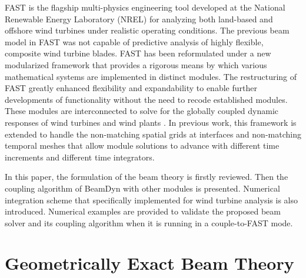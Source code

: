 \documentclass{aiaa-tc}
\begin{document}
FAST is the flagship multi-physics engineering tool developed at the National Renewable Energy Laboratory
(NREL) for analyzing both land-based and
offshore wind turbines under realistic operating conditions.  The previous
beam model in FAST was not capable of predictive analysis of highly flexible,
composite wind turbine blades. FAST has been reformulated under a
new modularized framework that provides a rigorous means by which various
mathematical systems are implemented in distinct modules. The restructuring of FAST greatly enhanced flexibility and expandability to enable further developments of functionality without the need to recode established modules. These modules are interconnected to solve for the globally coupled dynamic responses of wind turbines and wind plants \cite{Jonkman:2013,website:FASTModularizationFramework}. In previous work, this framework is extended to handle the non-matching spatial grids at interfaces and non-matching temporal meshes that allow module solutions to advance with different time increments and different time integrators. \cite{Sprague:2014}

In this paper, the formulation of the beam theory is firstly reviewed. Then the coupling algorithm of BeamDyn with other modules is presented. Numerical integration scheme that specifically implemented for wind turbine analysis is also introduced. Numerical examples are provided to validate the proposed beam solver and its coupling algorithm when it is running in a couple-to-FAST mode.

\section{Geometrically Exact Beam Theory}
\end{document}
